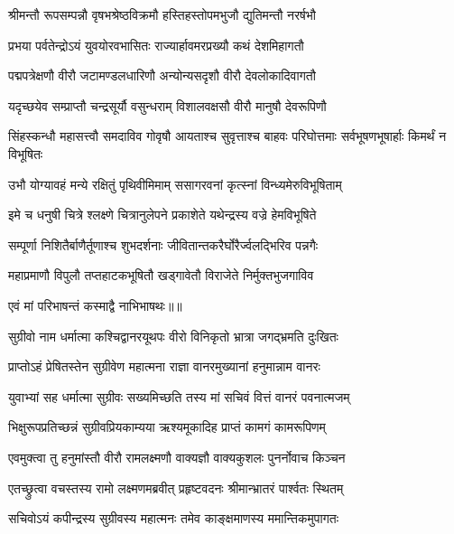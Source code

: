 \twolineshloka
{श्रीमन्तौ रूपसम्पन्नौ वृषभश्रेष्ठविक्रमौ}
{हस्तिहस्तोपमभुजौ द्युतिमन्तौ नरर्षभौ} %

\twolineshloka
{प्रभया पर्वतेन्द्रोऽयं युवयोरवभासितः}
{राज्यार्हावमरप्रख्यौ कथं देशमिहागतौ} %

\twolineshloka
{पद्मपत्रेक्षणौ वीरौ जटामण्डलधारिणौ}
{अन्योन्यसदृशौ वीरौ देवलोकादिवागतौ} %

\twolineshloka
{यदृच्छयेव सम्प्राप्तौ चन्द्रसूर्यौ वसुन्धराम्}
{विशालवक्षसौ वीरौ मानुषौ देवरूपिणौ} %

\threelineshloka
{सिंहस्कन्धौ महासत्त्वौ समदाविव गोवृषौ}
{आयताश्च सुवृत्ताश्च बाहवः परिघोत्तमाः}
{सर्वभूषणभूषार्हाः किमर्थं न विभूषितः} %

\twolineshloka
{उभौ योग्यावहं मन्ये रक्षितुं पृथिवीमिमाम्}
{ससागरवनां कृत्स्नां विन्ध्यमेरुविभूषिताम्} %

\twolineshloka
{इमे च धनुषी चित्रे श्लक्ष्णे चित्रानुलेपने}
{प्रकाशेते यथेन्द्रस्य वज्रे हेमविभूषिते} %

\twolineshloka
{सम्पूर्णा निशितैर्बाणैर्तूणाश्च शुभदर्शनाः}
{जीवितान्तकरैर्घोरैर्ज्वलद्भिरिव पन्नगैः} %

\twolineshloka
{महाप्रमाणौ विपुलौ तप्तहाटकभूषितौ}
{खड्गावेतौ विराजेते निर्मुक्तभुजगाविव} %

{एवं मां परिभाषन्तं कस्माद्वै नाभिभाषथः॥॥} %

\addtocounter{shlokacount}{1}

\twolineshloka
{सुग्रीवो नाम धर्मात्मा कश्चिद्वानरयूथपः}
{वीरो विनिकृतो भ्रात्रा जगद्भ्रमति दुःखितः} %

\twolineshloka
{प्राप्तोऽहं प्रेषितस्तेन सुग्रीवेण महात्मना}
{राज्ञा वानरमुख्यानां हनुमान्नाम वानरः} %

\twolineshloka
{युवाभ्यां सह धर्मात्मा सुग्रीवः सख्यमिच्छति}
{तस्य मां सचिवं वित्तं वानरं पवनात्मजम्} %

\twolineshloka
{भिक्षुरूपप्रतिच्छन्नं सुग्रीवप्रियकाम्यया}
{ऋश्यमूकादिह प्राप्तं कामगं कामरूपिणम्} %

\twolineshloka
{एवमुक्त्वा तु हनुमांस्तौ वीरौ रामलक्ष्मणौ}
{वाक्यज्ञौ वाक्यकुशलः पुनर्नोवाच किञ्चन} %

\twolineshloka
{एतच्छ्रुत्वा वचस्तस्य रामो लक्ष्मणमब्रवीत्}
{प्रहृष्टवदनः श्रीमान्भ्रातरं पार्श्वतः स्थितम्} %

\twolineshloka
{सचिवोऽयं कपीन्द्रस्य सुग्रीवस्य महात्मनः}
{तमेव काङ्क्षमाणस्य ममान्तिकमुपागतः} %

